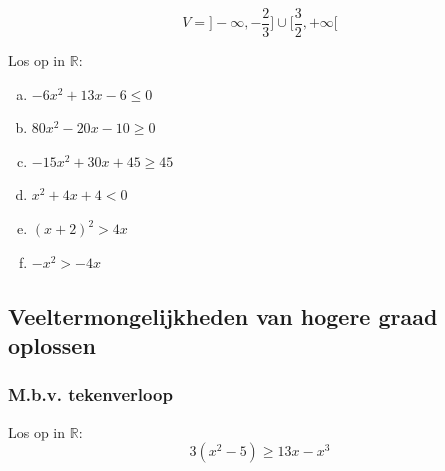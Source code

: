 \documentclass[12pt,twoside,a4paper]{article}
\begin{document}
\[V=]-\infty, -\dfrac{2}{3}] \cup [\dfrac{3}{2},+\infty[\]

\begin{oefening}
Los op in $\mathbb{R}$:
\begin{multicols}{2}
\begin{enumerate}[(a)]
  \itemsep0.8em
  \item $-6x^2+13x-6\leq 0$
  \item $80x^2-20x-10\geq 0$
  \item $-15x^2+30x+45\geq 45$
  \item $x^2+4x+4 < 0$
  \item $(x+2)^2 > 4x$
  \item $-x^2 > -4x$
\end{enumerate}
\end{multicols}
\end{oefening}

\subsection{Veeltermongelijkheden van hogere graad oplossen}

\subsubsection*{M.b.v. tekenverloop}

Los  op in $\mathbb{R}$: \[ 3(x^2-5) \geq 13x - x^3 \]
\end{document}
